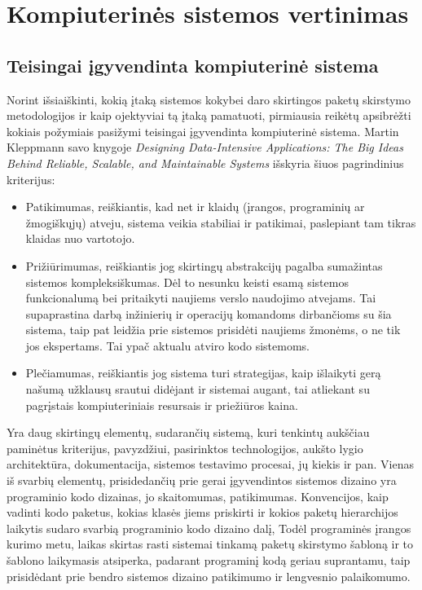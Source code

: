 \section{Kompiuterinės sistemos vertinimas}
\subsection{Teisingai įgyvendinta kompiuterinė sistema}
Norint išsiaiškinti, kokią įtaką sistemos kokybei daro skirtingos paketų skirstymo metodologijos ir kaip ojektyviai tą įtaką pamatuoti, pirmiausia
reikėtų apsibrėžti kokiais požymiais pasižymi teisingai įgyvendinta kompiuterinė sistema.
Martin Kleppmann savo knygoje \textit{Designing Data-Intensive Applications: The Big Ideas Behind Reliable, Scalable, and Maintainable Systems} išskyria šiuos pagrindinius kriterijus:
\begin{itemize}
    \item Patikimumas, reiškiantis, kad net ir klaidų (įrangos, programinių ar žmogiškųjų) atveju,
    sistema veikia stabiliai ir patikimai, paslepiant tam tikras klaidas nuo vartotojo\cite{DataIntensiveApplications}.
    \item Prižiūrimumas, reiškiantis jog skirtingų abstrakcijų pagalba sumažintas sistemos kompleksiškumas.
    Dėl to nesunku keisti esamą sistemos funkcionalumą bei pritaikyti naujiems verslo naudojimo atvejams.
    Tai supaprastina darbą inžinierių ir operacijų komandoms dirbančioms su šia sistema, taip pat leidžia prie sistemos prisidėti naujiems žmonėms, o ne
    tik jos ekspertams.
    Tai ypač aktualu atviro kodo sistemoms\cite{DataIntensiveApplications}.
    \item Plečiamumas, reiškiantis jog sistema turi strategijas, kaip išlaikyti gerą našumą užklausų
    srautui didėjant ir sistemai augant, tai atliekant su pagrįstais kompiuteriniais resursais ir
    priežiūros kaina\cite{DataIntensiveApplications}.
\end{itemize}
Yra daug skirtingų elementų, sudarančių sistemą, kuri tenkintų aukščiau paminėtus kriterijus,
pavyzdžiui, pasirinktos technologijos, aukšto lygio architektūra, dokumentacija, sistemos testavimo
procesai, jų kiekis ir pan.
Vienas iš svarbių elementų, prisidedančių prie gerai įgyvendintos sistemos dizaino yra programinio kodo dizainas, jo skaitomumas, patikimumas.
Konvencijos, kaip vadinti kodo paketus, kokias klasės jiems priskirti ir kokios paketų hierarchijos laikytis sudaro svarbią programinio kodo dizaino dalį,
Todėl programinės įrangos kurimo metu, laikas skirtas rasti sistemai tinkamą paketų skirstymo šabloną ir to šablono laikymasis atsiperka, padarant
programinį kodą geriau suprantamu, taip prisidėdant prie bendro sistemos dizaino patikimumo ir lengvesnio palaikomumo.

